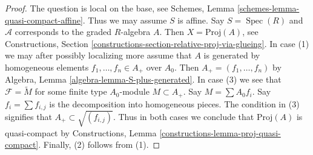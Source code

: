 \documentclass[10pt,a4paper]{amsart}
\theoremstyle{plain}
\theoremstyle{definition}
\theoremstyle{remark}
\numberwithin{equation}{subsection}
\def\Spec{\mathop{\mathrm{Spec}}}
\begin{document}
\begin{proof}
The question is local on the base, see
Schemes, Lemma \ref{schemes-lemma-quasi-compact-affine}.
Thus we may assume $S$ is affine.
Say $S = \Spec(R)$ and $\mathcal{A}$ corresponds to the
graded $R$-algebra $A$. Then $X = \text{Proj}(A)$, see
Constructions, Section \ref{constructions-section-relative-proj-via-glueing}.
In case (1) we may after possibly localizing more
assume that $A$ is generated by homogeneous elements
$f_1, \ldots, f_n \in A_{+}$ over $A_0$. Then
$A_{+} = (f_1, \ldots, f_n)$ by
Algebra, Lemma \ref{algebra-lemma-S-plus-generated}.
In case (3) we see that $\mathcal{F} = \widetilde{M}$
for some finite type $A_0$-module $M \subset A_{+}$. Say
$M = \sum A_0f_i$. Say $f_i = \sum f_{i, j}$ is the decomposition
into homogeneous pieces. The condition in (3) signifies that
$A_{+} \subset \sqrt{(f_{i, j})}$. Thus in both cases we conclude that
$\text{Proj}(A)$ is quasi-compact by
Constructions, Lemma \ref{constructions-lemma-proj-quasi-compact}.
Finally, (2) follows from (1).
\end{proof}
\end{document}
